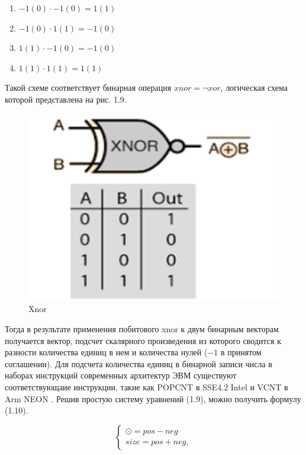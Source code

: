 \begin{enumerate}[label=\arabic*.]
    \item $-1(0) \cdot -1(0) = 1(1)$
    \item $-1(0) \cdot 1(1) = -1(0)$
    \item $1(1) \cdot -1(0) = -1(0)$
    \item $1(1) \cdot 1(1) = 1(1)$
\end{enumerate}

Такой схеме соответствует бинарная операция $xnor = \lnot xor$, логическая схема которой представлена на рис. 1.9.

\begin{figure}[H]
    \begin{center}
        \includegraphics[scale=0.3]{tex/inc/img/xnor.jpg}
        \caption{Xnor}
    \end{center}
\end{figure}

Тогда в результате применения побитового xnor к двум бинарным векторам получается вектор, подсчет скалярного произведения из которого сводится к разности количества единиц в нем и количества нулей ($-1$ в принятом соглашении). Для подсчета количества единиц в бинарной записи числа в наборах инструкций современных архитектур ЭВМ существуют соответствующаие инструкции, такие как POPCNT в SSE4.2 Intel \cite{intel} и VCNT в Arm NEON \cite{neon}. Решив простую систему уравнений (1.9), можно получить формулу (1.10).

\begin{equation}
 \begin{cases}
 \odot = pos - neg
 \\
 size = pos + neg,
 \end{cases}
\end{equation}

